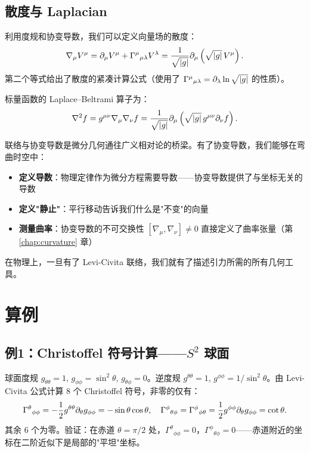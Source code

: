 \subsection{散度与 Laplacian}

利用度规和协变导数，我们可以定义向量场的散度：
\begin{equation}
    \nabla_\mu V^\mu = \partial_\mu V^\mu + \Gamma^\mu{}_{\mu\lambda} V^\lambda
    = \frac{1}{\sqrt{|g|}} \partial_\mu \left( \sqrt{|g|} \, V^\mu \right).
\end{equation}
第二个等式给出了散度的紧凑计算公式（使用了 $\Gamma^\mu{}_{\mu\lambda} = \partial_\lambda \ln\sqrt{|g|}$ 的性质）。

标量函数的 Laplace--Beltrami 算子为：
\begin{equation}
    \nabla^2 f = g^{\mu\nu} \nabla_\mu \nabla_\nu f = \frac{1}{\sqrt{|g|}} \partial_\mu \left( \sqrt{|g|} \, g^{\mu\nu} \partial_\nu f \right).
\end{equation}

\begin{note}
联络与协变导数是微分几何通往广义相对论的桥梁。有了协变导数，我们能够在弯曲时空中：
\begin{itemize}
    \item \textbf{定义导数}：物理定律作为微分方程需要导数——协变导数提供了与坐标无关的导数
    \item \textbf{定义"静止"}：平行移动告诉我们什么是"不变"的向量
    \item \textbf{测量曲率}：协变导数的不可交换性 $[\nabla_\mu, \nabla_\nu] \neq 0$ 直接定义了曲率张量（第 \ref{chap:curvature} 章）
\end{itemize}
在物理上，一旦有了 Levi-Civita 联络，我们就有了描述引力所需的所有几何工具。
\end{note}

\section{算例}

\subsection{例1：Christoffel 符号计算——$S^2$ 球面}

球面度规 $g_{\theta\theta}=1$, $g_{\phi\phi}=\sin^2\theta$, $g_{\theta\phi}=0$。逆度规 $g^{\theta\theta}=1$, $g^{\phi\phi}=1/\sin^2\theta$。由 Levi-Civita 公式计算 8 个 Christoffel 符号，非零的仅有：
\begin{equation}
    \Gamma^\theta{}_{\phi\phi} = -\frac{1}{2}g^{\theta\theta}\partial_\theta g_{\phi\phi} = -\sin\theta\cos\theta, \quad
    \Gamma^\phi{}_{\theta\phi} = \Gamma^\phi{}_{\phi\theta} = \frac{1}{2}g^{\phi\phi}\partial_\theta g_{\phi\phi} = \cot\theta.
\end{equation}
其余 6 个为零。验证：在赤道 $\theta = \pi/2$ 处，$\Gamma^\theta{}_{\phi\phi} = 0$，$\Gamma^\phi{}_{\theta\phi} = 0$——赤道附近的坐标在二阶近似下是局部的"平坦"坐标。


